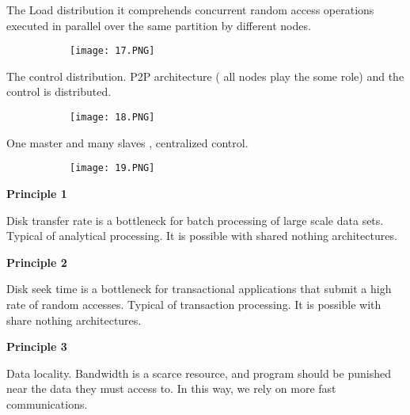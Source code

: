 \documentclass{article}
\begin{document}
The Load distribution it comprehends concurrent random access operations executed in parallel over the same partition by different nodes.

\begin{figure}[ht!]
  \centering
  \begin{subfigure}[b]{0.35\linewidth}
    \texttt{[image: 17.PNG]}
  \end{subfigure}
\end{figure}

The control distribution. P2P architecture ( all nodes play the some role) and the control is distributed.

\begin{figure}[ht!]
  \centering
  \begin{subfigure}[b]{0.35\linewidth}
    \texttt{[image: 18.PNG]}
  \end{subfigure}
\end{figure}

One master and many slaves , centralized control.

\begin{figure}[ht!]
  \centering
  \begin{subfigure}[b]{0.25\linewidth}
    \texttt{[image: 19.PNG]}
  \end{subfigure}
\end{figure}

\vspace{10mm}
\textbf{Principle 1}
\vspace{3mm}

Disk transfer rate is a bottleneck for batch processing of large scale data sets. Typical of analytical processing. It is possible with shared nothing architectures.

\vspace{3mm}
\textbf{Principle 2}
\vspace{3mm}

Disk seek time is a bottleneck for transactional applications that submit a high rate of random accesses. Typical of transaction processing. It is possible with share nothing architectures.

\vspace{3mm}
\textbf{Principle 3}
\vspace{3mm}

Data locality. Bandwidth is a scarce resource, and program should be punished near the data they must access to. In this way, we rely on more fast communications.
\end{document}
